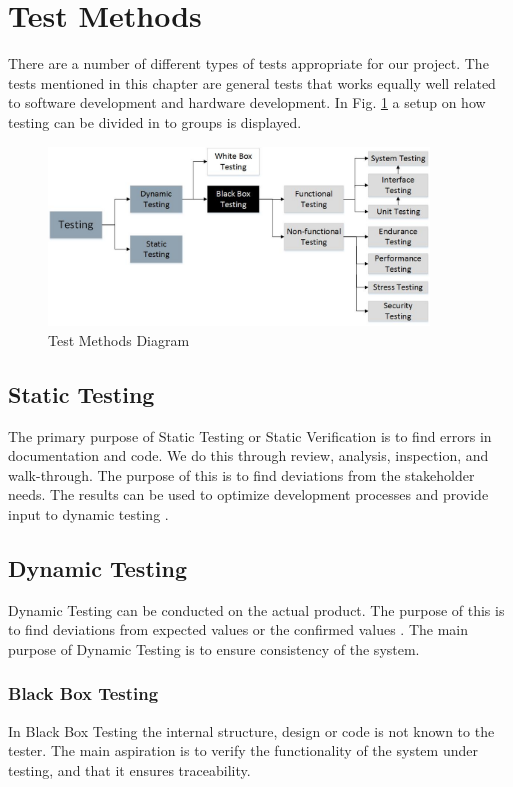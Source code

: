 \section{Test Methods}
There are a number of different types of tests appropriate for our project. The tests mentioned in this chapter are general tests that works equally well related to software development and hardware development. In Fig. \ref{fig:testing} a setup on how testing can be divided in to groups is displayed.

\begin{figure}[h]
    \centering
        \includegraphics[width=0.9\textwidth]{VAPIQ-PICTURES/testing}
        \caption{Test Methods Diagram}
        \label{fig:testing}
\end{figure}

\subsection{Static Testing}
The primary purpose of Static Testing or Static Verification is to find errors in documentation and code. We do this through review, analysis, inspection, and walk-through. The purpose of this is to find deviations from the stakeholder needs. The results can be used to optimize development processes and provide input to dynamic testing \cite{ref3}. 

\subsection{Dynamic Testing}
Dynamic Testing can be conducted on the actual product. The purpose of this is to find deviations from expected values or the confirmed values \cite{ref3}. The main purpose of Dynamic Testing is to ensure consistency of the system.

\subsubsection{Black Box Testing}
In Black Box Testing the internal structure, design or code is not known to the tester. The main aspiration is to verify the functionality of the system under testing, and that it ensures traceability. 

